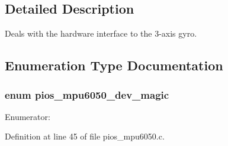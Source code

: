 \subsection{\-Detailed \-Description}
\-Deals with the hardware interface to the 3-\/axis gyro. 

\subsection{\-Enumeration \-Type \-Documentation}
\hypertarget{group___p_i_o_s___m_p_u6050_ga22a9ad4120542ed164b6afe9b094b6f3}{
\subsubsection[{pios\-\_\-mpu6050\-\_\-dev\-\_\-magic}]{\setlength{\rightskip}{0pt plus 5cm}enum {\bf pios\-\_\-mpu6050\-\_\-dev\-\_\-magic}}}\label{group___p_i_o_s___m_p_u6050_ga22a9ad4120542ed164b6afe9b094b6f3}
\begin{Desc}
\item[\-Enumerator\-: ]\par
\begin{description}
\item[{\em 
\hypertarget{group___p_i_o_s___m_p_u6050_gga22a9ad4120542ed164b6afe9b094b6f3ab2ce219069f414a9b51976c869c1c3b6}{\-P\-I\-O\-S\-\_\-\-M\-P\-U6050\-\_\-\-D\-E\-V\-\_\-\-M\-A\-G\-I\-C}\label{group___p_i_o_s___m_p_u6050_gga22a9ad4120542ed164b6afe9b094b6f3ab2ce219069f414a9b51976c869c1c3b6}
}]\end{description}
\end{Desc}



\-Definition at line 45 of file pios\-\_\-mpu6050.\-c.



